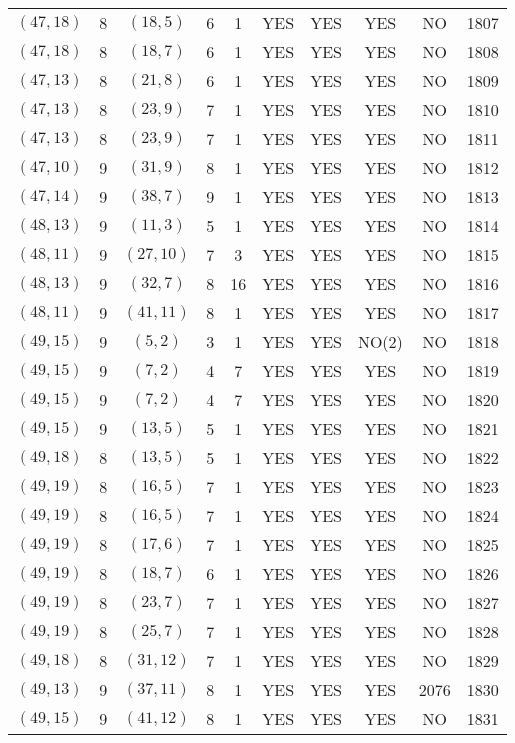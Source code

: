 \begin{longtable}{|c|c|c|c|c|c|c|c|c|c|}
$(47, 18)$ & 8 & $(18, 5)$ & 6 & 1 & YES & YES & YES & NO & 1807\\
$(47, 18)$ & 8 & $(18, 7)$ & 6 & 1 & YES & YES & YES & NO & 1808\\
$(47, 13)$ & 8 & $(21, 8)$ & 6 & 1 & YES & YES & YES & NO & 1809\\
$(47, 13)$ & 8 & $(23, 9)$ & 7 & 1 & YES & YES & YES & NO & 1810\\
$(47, 13)$ & 8 & $(23, 9)$ & 7 & 1 & YES & YES & YES & NO & 1811\\
$(47, 10)$ & 9 & $(31, 9)$ & 8 & 1 & YES & YES & YES & NO & 1812\\
$(47, 14)$ & 9 & $(38, 7)$ & 9 & 1 & YES & YES & YES & NO & 1813\\
$(48, 13)$ & 9 & $(11, 3)$ & 5 & 1 & YES & YES & YES & NO & 1814\\
$(48, 11)$ & 9 & $(27, 10)$ & 7 & 3 & YES & YES & YES & NO & 1815\\
$(48, 13)$ & 9 & $(32, 7)$ & 8 & 16 & YES & YES & YES & NO & 1816\\
$(48, 11)$ & 9 & $(41, 11)$ & 8 & 1 & YES & YES & YES & NO & 1817\\
$(49, 15)$ & 9 & $(5, 2)$ & 3 & 1 & YES & YES & NO(2) & NO & 1818\\
$(49, 15)$ & 9 & $(7, 2)$ & 4 & 7 & YES & YES & YES & NO & 1819\\
$(49, 15)$ & 9 & $(7, 2)$ & 4 & 7 & YES & YES & YES & NO & 1820\\
$(49, 15)$ & 9 & $(13, 5)$ & 5 & 1 & YES & YES & YES & NO & 1821\\
$(49, 18)$ & 8 & $(13, 5)$ & 5 & 1 & YES & YES & YES & NO & 1822\\
$(49, 19)$ & 8 & $(16, 5)$ & 7 & 1 & YES & YES & YES & NO & 1823\\
$(49, 19)$ & 8 & $(16, 5)$ & 7 & 1 & YES & YES & YES & NO & 1824\\
$(49, 19)$ & 8 & $(17, 6)$ & 7 & 1 & YES & YES & YES & NO & 1825\\
$(49, 19)$ & 8 & $(18, 7)$ & 6 & 1 & YES & YES & YES & NO & 1826\\
$(49, 19)$ & 8 & $(23, 7)$ & 7 & 1 & YES & YES & YES & NO & 1827\\
$(49, 19)$ & 8 & $(25, 7)$ & 7 & 1 & YES & YES & YES & NO & 1828\\
$(49, 18)$ & 8 & $(31, 12)$ & 7 & 1 & YES & YES & YES & NO & 1829\\
$(49, 13)$ & 9 & $(37, 11)$ & 8 & 1 & YES & YES & YES & 2076 & 1830\\
$(49, 15)$ & 9 & $(41, 12)$ & 8 & 1 & YES & YES & YES & NO & 1831\\

\end{longtable}
